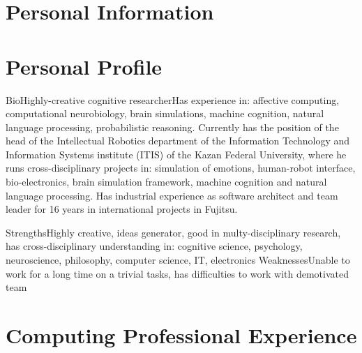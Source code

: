 \documentclass{moderncv}
\begin{document}

\section{Personal Information}
 
\section{Personal Profile}

\cventry
{Bio}{Highly-creative cognitive researcher}{}{}{}{Has experience in: affective computing, computational neurobiology, brain simulations, machine cognition, natural language processing, probabilistic reasoning. Currently has the position of the head of the Intellectual Robotics department of the Information Technology and Information Systems institute (ITIS) of the Kazan Federal University, where he runs cross-disciplinary projects in: simulation of emotions, human-robot interface, bio-electronics, brain simulation framework, machine cognition and natural language processing. Has industrial experience as software architect and team leader for 16 years in international projects in Fujitsu.}

\cvcomputer
{Strengths}{Highly creative, ideas generator, good in multy-disciplinary research, has cross-disciplinary understanding in: cognitive science, psychology, neuroscience, philosophy, computer science, IT, electronics}
{Weaknesses}{Unable to work for a long time on a trivial tasks, has difficulties to work with demotivated team}

\section{Computing Professional Experience}

\end{document}
